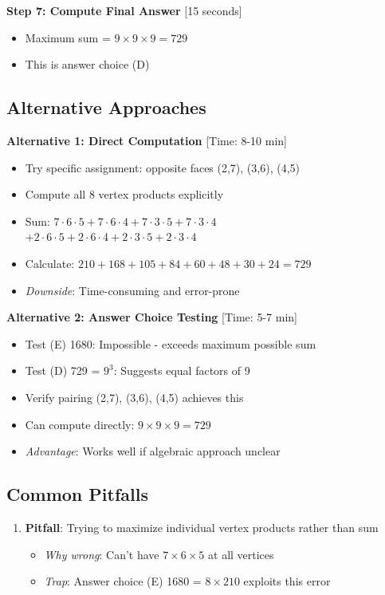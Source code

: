 \documentclass[]{article}
\begin{document}
\begin{solutionbox}
\textbf{Step 7: Compute Final Answer} [15 seconds]
\begin{itemize}
    \item Maximum sum = $9 \times 9 \times 9 = 729$
    \item This is answer choice (D)
\end{itemize}

\subsection*{Alternative Approaches}

\textbf{Alternative 1: Direct Computation} [Time: 8-10 min]
\begin{itemize}
    \item Try specific assignment: opposite faces (2,7), (3,6), (4,5)
    \item Compute all 8 vertex products explicitly
    \item Sum: $7 \cdot 6 \cdot 5 + 7 \cdot 6 \cdot 4 + 7 \cdot 3 \cdot 5 + 7 \cdot 3 \cdot 4$\\
          $+ 2 \cdot 6 \cdot 5 + 2 \cdot 6 \cdot 4 + 2 \cdot 3 \cdot 5 + 2 \cdot 3 \cdot 4$
    \item Calculate: $210+168+105+84+60+48+30+24 = 729$
    \item \textit{Downside}: Time-consuming and error-prone
\end{itemize}

\textbf{Alternative 2: Answer Choice Testing} [Time: 5-7 min]
\begin{itemize}
    \item Test (E) 1680: Impossible - exceeds maximum possible sum
    \item Test (D) 729 = $9^3$: Suggests equal factors of 9
    \item Verify pairing (2,7), (3,6), (4,5) achieves this
    \item Can compute directly: $9 \times 9 \times 9 = 729$
    \item \textit{Advantage}: Works well if algebraic approach unclear
\end{itemize}

\subsection*{Common Pitfalls}

\begin{enumerate}
    \item \textbf{Pitfall}: Trying to maximize individual vertex products rather than sum
    \begin{itemize}
        \item \textit{Why wrong}: Can't have $7 \times 6 \times 5$ at all vertices
        \item \textit{Trap}: Answer choice (E) 1680 = $8 \times 210$ exploits this error
    \end{itemize}
    

\end{enumerate}
\end{solutionbox}
\end{document}
